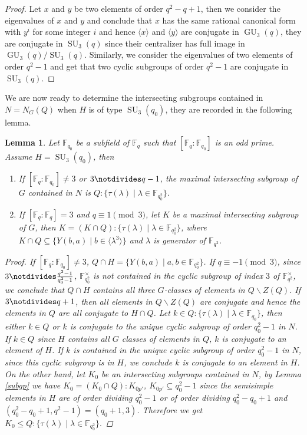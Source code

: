 \documentclass[12pt,reqno]{amsart}
\newcommand{\SU}{\operatorname{SU}}
\newcommand{\GU}{\operatorname{GU}}
\newcommand{\FF}{\mathbb{F}}
\newcommand{\lr}{\langle}
\newcommand{\rr}{\rangle}
\theoremstyle{plain}
\newtheorem{lemma}[proposition]{Lemma}
\theoremstyle{definition}
\begin{document}
\begin{proof}
Let $x$ and $y$ be two elements of order $q^2-q+1$, then we consider the eigenvalues of $x$ and $y$ and conclude that $x$ has the same rational canonical form with $y^i$ for some integer $i$ and hence $\lr x \rr$ and $\lr y \rr$ are conjugate in $\GU_3(q)$, they are conjugate in $\SU_3(q)$ since their centralizer has full image in $\GU_3(q)/\SU_3(q)$.
Similarly, we consider the eigenvalues of two elements of order $q^2-1$ and get that two cyclic subgroups of order $q^2-1$ are conjugate in $\SU_3(q)$.
\end{proof}

We are now ready to determine the intersecting subgroups contained in $N=N_G(Q)$ when $H$ is of type $\SU_3(q_0)$, they are recorded in the following lemma.

\begin{lemma}
	Let $\FF_{q_0}$ be a subfield of $\FF_q$ such that $[\FF_q:\FF_{q_0}]$ is an odd prime.  Assume $H=\SU_3(q_0)$, then
	\begin{enumerate}[\rm(i)]
		\item If  $[\FF_q:\FF_{q_0}]\neq 3$ or $3\notdivides q-1$, the maximal intersecting subgroup of  $G$ contained in $N$ is $Q{:}\{\tau(\lambda)\mid \lambda\in \FF_{q^2_0} \}$.
		\item If $[\FF_q:\FF_q]=3$ and $q\equiv 1 \pmod 3$, let $K$ be a maximal intersecting subgroup of $G$, then $K=(K\cap Q){:}\{\tau(\lambda)\mid \lambda\in \FF_{q^2_0} \}$, where $K\cap Q\subseteq  \{Y(b,a)\mid b\in \lr \lambda^3 \rr   \}$ and $\lambda$ is generator of $\FF_{q^2}$.
	\end{enumerate}
\begin{proof}
	If $[\FF_q:\FF_{q_0}]\neq 3$, $Q\cap H=\{Y(b,a)\mid a,b\in \FF_{q^2_0}  \}$.
	If $q\equiv -1 \pmod 3$, since $3 \notdivides \frac{q^2-1}{q_0^2-1}$, $\FF_{q^2_0}^\times$ is not contained in the cyclic subgroup of index $3$ of $\FF_{q^2}^{\times}$, we conclude that $Q\cap H$ contains all three $G$-classes of elements in $Q\backslash Z(Q)$.
	If $3\notdivides q+1$, then  all elements in $Q\backslash Z(Q)$ are conjugate and hence the elements in $Q$ are all conjugate to $H\cap Q$.
	 Let  $k\in Q{:}\{\tau(\lambda)\mid \lambda\in \FF_{q_0}\}$, then either $k\in Q$ or $k$ is conjugate to the unique cyclic subgroup of order $q_0^2-1$ in $N$. If $k\in Q$ since $H$ contains all $G$ classes of elements in $Q$, $k$ is conjugate to an element of $H$.
	If $k$ is contained in the unique cyclic subgroup of  order $q_0^2-1$ in $N$, since this cyclic subgroup is in $H$, we conclude $k$ is conjugate to an element in $H$.
	On the other hand, let $K_0$ be an intersecting subgroups contained in $N$, by Lemma \ref{subgp} we have $K_0=(K_0\cap Q){:}K_{0p'}$, $K_{0p'}\subseteq q_0^2-1$ since the semisimple elements in $H$ are of order dividing $q_0^2-1$ or of order dividing $q_0^2-q_0+1$ and $(q_0^2-q_0+1,q^2-1)=(q_0+1,3)$. Therefore we get $K_0\le Q{:}\{\tau(\lambda)\mid \lambda\in \FF_{q^2_0}\}.$
	

\end{proof}
\end{lemma}
\end{document}
